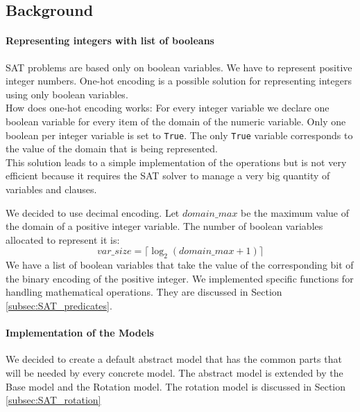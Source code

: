 \subsection{Background}\label{subsec:SAT_background}

  \paragraph*{Representing integers with list of booleans}
    SAT problems are based only on boolean variables. We have to represent positive integer numbers. 
    One-hot encoding is a possible solution for representing integers using only boolean variables.\\
    How does one-hot encoding works:
    For every integer variable we declare one boolean variable for every item of the domain of 
    the numeric variable. Only one boolean per integer variable is set to \texttt{True}. The only \texttt{True} 
    variable corresponds to the value of the domain that is being represented.\\

    This solution leads to a simple implementation of the operations but is not very efficient 
    because it requires the SAT solver to manage a very big quantity of variables and clauses.

    We decided to use decimal encoding. Let \(domain\_max\)  be the maximum value of the domain of 
    a positive integer variable. The number of boolean variables allocated to represent it is:
    \begin{equation}
        var\_size = \lceil \log_2 (domain\_max + 1)\rceil
    \end{equation}
    We have a list of boolean variables that take the value of the corresponding bit of the binary encoding
    of the positive integer. We implemented specific functions for handling mathematical operations.
    They are discussed in Section \ref{subsec:SAT_predicates}. \\

  \paragraph*{Implementation of the Models}
    We decided to create a default abstract model that has the common parts that will be needed by
    every concrete model. The abstract model is extended by the Base model and the Rotation model. 
    The rotation model is discussed in Section \ref{subsec:SAT_rotation}\\


